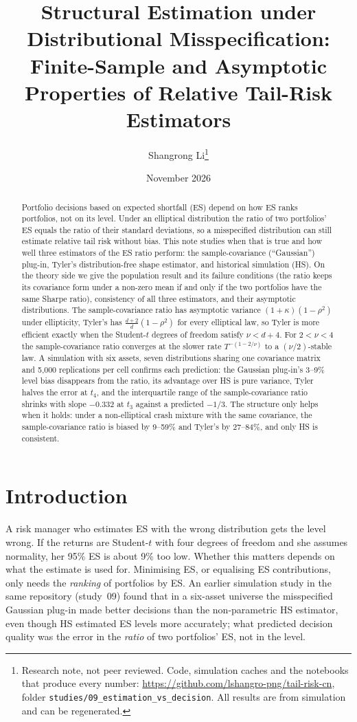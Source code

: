 \documentclass[11pt]{article}
\title{Structural Estimation under Distributional Misspecification:\\
\large Finite-Sample and Asymptotic Properties of Relative Tail-Risk Estimators}
\author{Shangrong Li\thanks{Research note, not peer reviewed. Code, simulation caches and the notebooks that
produce every number: \url{https://github.com/lshangro-png/tail-risk-cn}, folder
\texttt{studies/09\_estimation\_vs\_decision}. All results are from simulation and can be regenerated.}}
\date{November 2026}
\theoremstyle{remark}
\begin{document}
\maketitle

\begin{abstract}
\noindent
Portfolio decisions based on expected shortfall (ES) depend on how ES ranks portfolios, not on its level.
Under an elliptical distribution the ratio of two portfolios' ES equals the ratio of their standard deviations,
so a misspecified distribution can still estimate relative tail risk without bias. This note studies when that
is true and how well three estimators of the ES ratio perform: the sample-covariance (``Gaussian'') plug-in,
Tyler's distribution-free shape estimator, and historical simulation (HS). On the theory side we give the
population result and its failure conditions (the ratio keeps its covariance form under a non-zero mean if
and only if the two portfolios have the same Sharpe ratio), consistency of all three estimators, and their
asymptotic distributions. The sample-covariance ratio has asymptotic variance $(1+\kappa)(1-\rho^2)$ under
ellipticity, Tyler's has $\frac{d+2}{d}(1-\rho^2)$ for every elliptical law, so Tyler is more efficient
exactly when the Student-$t$ degrees of freedom satisfy $\nu<d+4$. For $2<\nu<4$ the sample-covariance ratio
converges at the slower rate $T^{-(1-2/\nu)}$ to a $(\nu/2)$-stable law. A simulation with six assets,
seven distributions sharing one covariance matrix and 5{,}000 replications per cell confirms each prediction:
the Gaussian plug-in's 3--9\% level bias disappears from the ratio, its advantage over HS is pure variance,
Tyler halves the error at $t_4$, and the interquartile range of the sample-covariance ratio shrinks with slope
$-0.332$ at $t_3$ against a predicted $-1/3$. The structure only helps when it holds: under a non-elliptical
crash mixture with the same covariance, the sample-covariance ratio is biased by 9--59\% and Tyler's by
27--84\%, and only HS is consistent.
\end{abstract}

\section{Introduction}

A risk manager who estimates ES with the wrong distribution gets the level wrong. If the returns are
Student-$t$ with four degrees of freedom and she assumes normality, her 95\% ES is about 9\% too low. Whether
this matters depends on what the estimate is used for. Minimising ES, or equalising ES contributions, only
needs the \emph{ranking} of portfolios by ES. An earlier simulation study in the same repository (study~09)
found that in a six-asset universe the misspecified Gaussian plug-in made better decisions than the
non-parametric HS estimator, even though HS estimated ES levels more accurately; what predicted decision
quality was the error in the \emph{ratio} of two portfolios' ES, not in the level.
\end{document}
